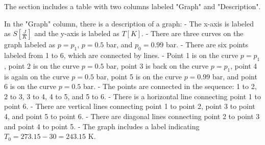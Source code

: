 The section includes a table with two columns labeled "Graph" and "Description". 

In the "Graph" column, there is a description of a graph:
- The x-axis is labeled as \( S \left[\frac{J}{K}\right] \) and the y-axis is labeled as \( T[K] \).
- There are three curves on the graph labeled as \( p = p_1 \), \( p = 0.5 \) bar, and \( p_0 = 0.99 \) bar.
- There are six points labeled from 1 to 6, which are connected by lines.
- Point 1 is on the curve \( p = p_1 \), point 2 is on the curve \( p = 0.5 \) bar, point 3 is back on the curve \( p = p_1 \), point 4 is again on the curve \( p = 0.5 \) bar, point 5 is on the curve \( p = 0.99 \) bar, and point 6 is on the curve \( p = 0.5 \) bar.
- The points are connected in the sequence: 1 to 2, 2 to 3, 3 to 4, 4 to 5, and 5 to 6.
- There is a horizontal line connecting point 1 to point 6.
- There are vertical lines connecting point 1 to point 2, point 3 to point 4, and point 5 to point 6.
- There are diagonal lines connecting point 2 to point 3 and point 4 to point 5.
- The graph includes a label indicating \( T_0 = 273.15 - 30 = 243.15 \) K.